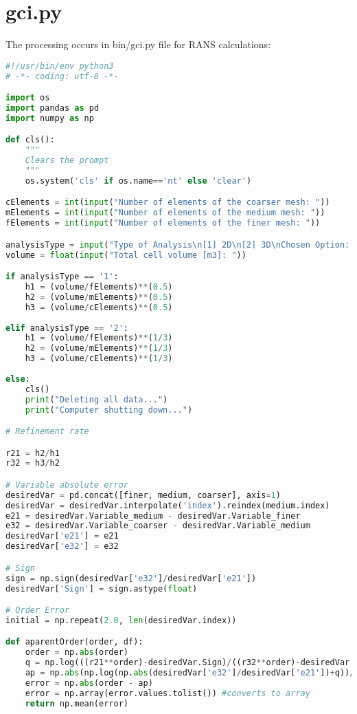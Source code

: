 \section{gci.py}
The processing occurs in bin/gci.py file for RANS calculations:

\begin{lstlisting}[language=python]
#!/usr/bin/env python3
# -*- coding: utf-8 -*-

import os
import pandas as pd
import numpy as np

def cls():
    """
    Clears the prompt
    """
    os.system('cls' if os.name=='nt' else 'clear')

cElements = int(input("Number of elements of the coarser mesh: "))
mElements = int(input("Number of elements of the medium mesh: "))
fElements = int(input("Number of elements of the finer mesh: "))

analysisType = input("Type of Analysis\n[1] 2D\n[2] 3D\nChosen Option: ")
volume = float(input("Total cell volume [m3]: "))

if analysisType == '1':
	h1 = (volume/fElements)**(0.5)
	h2 = (volume/mElements)**(0.5)
	h3 = (volume/cElements)**(0.5)
	
elif analysisType == '2':
	h1 = (volume/fElements)**(1/3)
	h2 = (volume/mElements)**(1/3)
	h3 = (volume/cElements)**(1/3)
	
else:
	cls()
	print("Deleting all data...")
	print("Computer shutting down...")

# Refinement rate

r21 = h2/h1
r32 = h3/h2

# Variable absolute error
desiredVar = pd.concat([finer, medium, coarser], axis=1)
desiredVar = desiredVar.interpolate('index').reindex(medium.index)
e21 = desiredVar.Variable_medium - desiredVar.Variable_finer
e32 = desiredVar.Variable_coarser - desiredVar.Variable_medium
desiredVar['e21'] = e21
desiredVar['e32'] = e32

# Sign
sign = np.sign(desiredVar['e32']/desiredVar['e21'])
desiredVar['Sign'] = sign.astype(float)

# Order Error
initial = np.repeat(2.0, len(desiredVar.index))

def aparentOrder(order, df):
    order = np.abs(order)
    q = np.log(((r21**order)-desiredVar.Sign)/((r32**order)-desiredVar.Sign))
    ap = np.abs(np.log(np.abs(desiredVar['e32']/desiredVar['e21'])+q))/np.log(r21)
    error = np.abs(order - ap)
    error = np.array(error.values.tolist()) #converts to array
    return np.mean(error)


\end{lstlisting}
